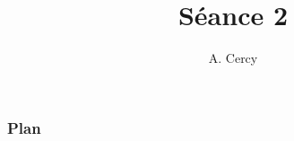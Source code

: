 \documentclass{beamer}
\title[Présentation]{Séance 2} %
\author{A. Cercy} %
\institute[] %
{
Collège Pablo Neruda
}
\date{} %
\begin{document}
\begin{frame}
\titlepage %
\end{frame}

\begin{frame}
\frametitle{Plan} %
\tableofcontents %
\end{frame}







\end{document}

